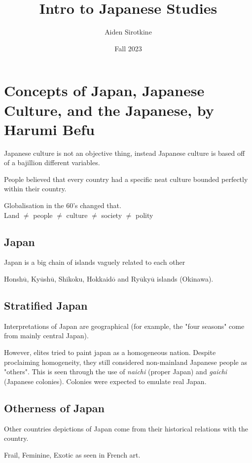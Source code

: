 \documentclass{report}
\date{Fall 2023}
\title{Intro to Japanese Studies}
\author{Aiden Sirotkine}
\begin{document}
\pagestyle{fancy}
\maketitle
\tableofcontents
\clearpage


\chapter{Concepts of Japan, Japanese Culture, and the Japanese, by Harumi Befu}
Japanese culture is not an objective thing, instead Japanese culture is based off of a bajillion different variables.

People believed that every country had a specific neat culture bounded perfectly within their country.

Globalisation in the 60's changed that. \\ Land $\neq$ people $\neq$ culture $\neq$ society $\neq$ polity

\section*{Japan}
Japan is a big chain of islands vaguely related to each other 

Honsh$\overline{\mbox{u}}$, Ky$\overline{\mbox{u}}$sh$\overline{\mbox{u}}$, Shikoku, Hokkaid$\overline{\mbox{o}}$ and Ry$\overline{\mbox{u}}$ky$\overline{\mbox{u}}$ islands (Okinawa).

\section*{Stratified Japan}
Interpretations of Japan are geographical (for example, the "four seasons" come from mainly central Japan).

However, elites tried to paint japan as a homogeneous nation. Despite proclaiming homogeneity, they still considered non-mainland Japanese people as "others".  This is seen through the use of \textit{naichi} (proper Japan) and \textit{gaichi} (Japanese colonies). Colonies were expected to emulate real Japan. 

\section*{Otherness of Japan}
Other countries depictions of Japan come from their historical relations with the country. 

Frail, Feminine, Exotic as seen in French art.
\end{document}
